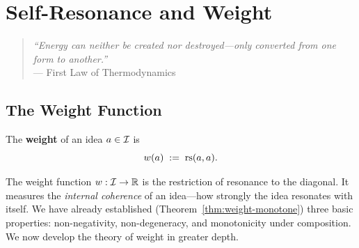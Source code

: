 
\chapter{Self-Resonance and Weight}

\begin{quote}
\textit{``Energy can neither be created nor destroyed---only converted
from one form to another.''}\\
\hfill --- First Law of Thermodynamics
\end{quote}

\section{The Weight Function}

\begin{definition}[Weight]\label{def:weight}
The \textbf{weight} of an idea $a \in \mathcal{I}$ is
\[
    w(a) \;:=\; \mathrm{rs}(a, a).
\]
\end{definition}

The weight function $w : \mathcal{I} \to \mathbb{R}$ is the restriction of resonance to the
diagonal. It measures the \emph{internal coherence} of an idea---how
strongly the idea resonates with itself. We have already established
(Theorem~\ref{thm:weight-monotone}) three basic properties: non-negativity,
non-degeneracy, and monotonicity under composition. We now develop the
theory of weight in greater depth.

